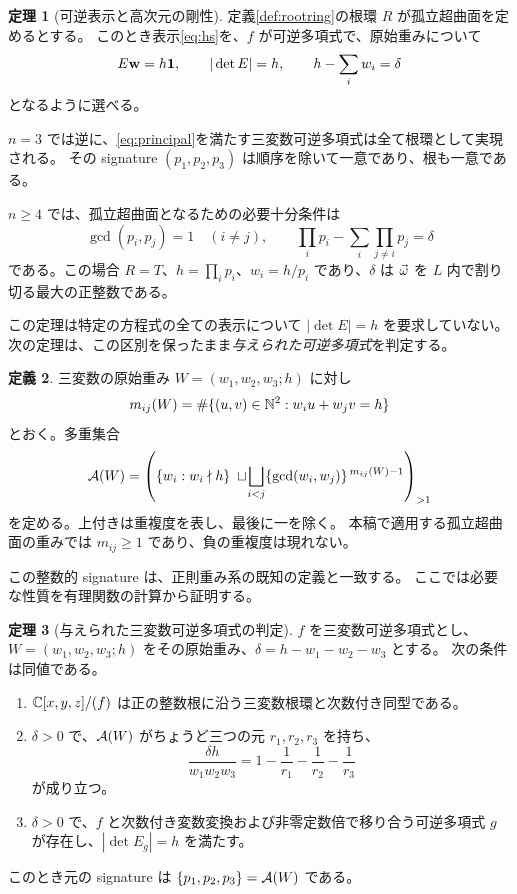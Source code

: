\documentclass[11pt,a4paper]{ltjsarticle}
\numberwithin{equation}{section}
\theoremstyle{definition}
\newtheorem{theorem}{定理}[section]
\newtheorem{definition}[theorem]{定義}
\begin{document}
\begin{theorem}[可逆表示と高次元の剛性]\label{thm:main}
定義\ref{def:rootring}の根環 $R$ が孤立超曲面を定めるとする。
このとき表示\eqref{eq:hs}を、$f$ が可逆多項式で、原始重みについて
\begin{equation}\label{eq:principal}
 E\mathbf w=h\mathbf 1,\qquad |\det E|=h,\qquad h-\sum_iw_i=\delta
\end{equation}
となるように選べる。

$n=3$ では逆に、\eqref{eq:principal}を満たす三変数可逆多項式は全て根環として実現される。
その signature $(p_1,p_2,p_3)$ は順序を除いて一意であり、根も一意である。

$n\ge4$ では、孤立超曲面となるための必要十分条件は
\begin{equation}\label{eq:highclassification}
 \gcd(p_i,p_j)=1\quad(i\ne j),\qquad
 \prod_i p_i-\sum_i\prod_{j\ne i}p_j=\delta
\end{equation}
である。この場合 $R=T$、$h=\prod_i p_i$、$w_i=h/p_i$ であり、$\delta$ は $\vec\omega$ を $L$ 内で割り切る最大の正整数である。
\end{theorem}
この定理は特定の方程式の全ての表示について $|\det E|=h$ を要求していない。
次の定理は、この区別を保ったまま\emph{与えられた可逆多項式}を判定する。

\begin{definition}\label{def:sigW}
三変数の原始重み $W=(w_1,w_2,w_3;h)$ に対し
\[
 m_{ij}(W)=\#\{(u,v)\in\mathbb N^2:w_i u+w_jv=h\}
\]
とおく。多重集合
\begin{equation}\label{eq:arithmeticSig}
 \mathcal A(W)=
 \left(\{w_i:w_i\nmid h\}\;\sqcup\!
 \bigsqcup_{i<j}\{\gcd(w_i,w_j)\}^{\,m_{ij}(W)-1}\right)_{>1}
\end{equation}
を定める。上付きは重複度を表し、最後に一を除く。
本稿で適用する孤立超曲面の重みでは $m_{ij}\ge1$ であり、負の重複度は現れない。
\end{definition}
この整数的 signature は、正則重み系の既知の定義と一致する\cite[Definition 2.5]{Takahashi}。
ここでは必要な性質を有理関数の計算から証明する。

\begin{theorem}[与えられた三変数可逆多項式の判定]\label{thm:intrinsic}
$f$ を三変数可逆多項式とし、$W=(w_1,w_2,w_3;h)$ をその原始重み、$\delta=h-w_1-w_2-w_3$ とする。
次の条件は同値である。
\begin{enumerate}
\item $\mathbb C[x,y,z]/(f)$ は正の整数根に沿う三変数根環と次数付き同型である。
\item $\delta>0$ で、$\mathcal A(W)$ がちょうど三つの元 $r_1,r_2,r_3$ を持ち、
\begin{equation}\label{eq:numericcriterion}
 \frac{\delta h}{w_1w_2w_3}=1-\frac1{r_1}-\frac1{r_2}-\frac1{r_3}
\end{equation}
が成り立つ。
\item $\delta>0$ で、$f$ と次数付き変数変換および非零定数倍で移り合う可逆多項式 $g$ が存在し、$|\det E_g|=h$ を満たす。
\end{enumerate}
このとき元の signature は $\{p_1,p_2,p_3\}=\mathcal A(W)$ である。
\end{theorem}
\end{document}
